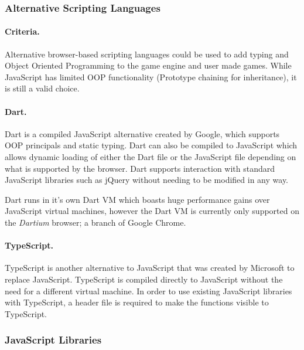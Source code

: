 \documentclass[a4paper, 12pt]{article}
\begin{document}


\subsubsection{Alternative Scripting Languages}
\paragraph{Criteria.}
Alternative browser-based scripting languages could be used to add typing and Object Oriented Programming to the game engine and user made games. While JavaScript has limited OOP functionality (Prototype chaining for inheritance), it is still a valid choice.


\paragraph{Dart.}
Dart is a compiled JavaScript alternative created by Google, which supports OOP principals and static typing. Dart can also be compiled to JavaScript which allows dynamic loading of either the Dart file or the JavaScript file depending on what is supported by the browser. Dart supports interaction with standard JavaScript libraries such as jQuery without needing to be modified in any way.

Dart runs in it's own Dart VM which boasts huge performance gains over JavaScript virtual machines, however the Dart VM is currently only supported on the \emph{Dartium} browser; a branch of Google Chrome.


\paragraph{TypeScript.}
TypeScript is another alternative to JavaScript that was created by Microsoft to replace JavaScript. TypeScript is compiled directly to JavaScript without the need for a different virtual machine. In order to use existing JavaScript libraries with TypeScript, a header file is required to make the functions visible to TypeScript.



\subsubsection{JavaScript Libraries}
\end{document}

